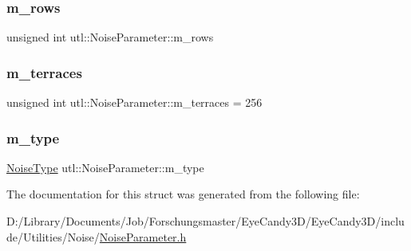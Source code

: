 \subsubsection{\texorpdfstring{m\+\_\+rows}{m\_rows}}
{\footnotesize\ttfamily unsigned int utl\+::\+Noise\+Parameter\+::m\+\_\+rows}

\mbox{\label{structutl_1_1_noise_parameter_a7b54a4904b765e2c6a1c2cba64486706}} 
\subsubsection{\texorpdfstring{m\+\_\+terraces}{m\_terraces}}
{\footnotesize\ttfamily unsigned int utl\+::\+Noise\+Parameter\+::m\+\_\+terraces = 256}

\mbox{\label{structutl_1_1_noise_parameter_a73630ba68ef9be199087fdeeb4d58313}} 
\subsubsection{\texorpdfstring{m\+\_\+type}{m\_type}}
{\footnotesize\ttfamily \mbox{\hyperlink{namespaceutl_a42b249122648f147a9f518c8661cc8d2}{Noise\+Type}} utl\+::\+Noise\+Parameter\+::m\+\_\+type}



The documentation for this struct was generated from the following file\+:\begin{DoxyCompactItemize}
\item 
D\+:/\+Library/\+Documents/\+Job/\+Forschungsmaster/\+Eye\+Candy3\+D/\+Eye\+Candy3\+D/include/\+Utilities/\+Noise/\mbox{\hyperlink{_noise_parameter_8h}{Noise\+Parameter.\+h}}\end{DoxyCompactItemize}
